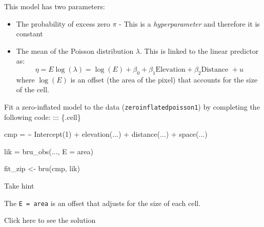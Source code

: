 \documentclass[
  letterpaper,
  DIV=11,
  numbers=noendperiod]{scrartcl}
\newenvironment{Shaded}{\begin{snugshade}}{\end{snugshade}}
\newcommand{\AttributeTok}[1]{\textcolor[rgb]{0.40,0.45,0.13}{#1}}
\newcommand{\DecValTok}[1]{\textcolor[rgb]{0.68,0.00,0.00}{#1}}
\newcommand{\ErrorTok}[1]{\textcolor[rgb]{0.68,0.00,0.00}{#1}}
\newcommand{\FunctionTok}[1]{\textcolor[rgb]{0.28,0.35,0.67}{#1}}
\newcommand{\NormalTok}[1]{\textcolor[rgb]{0.00,0.23,0.31}{#1}}
\newcommand{\OtherTok}[1]{\textcolor[rgb]{0.00,0.23,0.31}{#1}}
\newcommand{\SpecialCharTok}[1]{\textcolor[rgb]{0.37,0.37,0.37}{#1}}
\providecommand{\tightlist}{%
  \setlength{\itemsep}{0pt}\setlength{\parskip}{0pt}}\usepackage{longtable,booktabs,array}
\begin{document}
This model has two parameters:

\begin{itemize}
\tightlist
\item
  The probability of excess zero \(\pi\) - This is a
  \emph{hyperparameter} and therefore it is constant
\item
  The mean of the Poisson distribution \(\lambda\). This is linked to
  the linear predictor as: \[
  \eta = E\log(\lambda) = \log(E) + \beta_0 + \beta_1\text{Elevation} + \beta_2\text{Distance } + u
  \] where \(\log(E)\) is an offset (the area of the pixel) that
  accounts for the size of the cell.
\end{itemize}

\begin{tcolorbox}[enhanced jigsaw, colback=white, bottomrule=.15mm, arc=.35mm, opacitybacktitle=0.6, rightrule=.15mm, breakable, coltitle=black, toprule=.15mm, bottomtitle=1mm, toptitle=1mm, titlerule=0mm, left=2mm, leftrule=.75mm, title={Task}, opacityback=0, colframe=quarto-callout-warning-color-frame, colbacktitle=quarto-callout-warning-color!10!white]

Fit a zero-inflated model to the data (\texttt{zeroinflatedpoisson1}) by
completing the following code: ::: \{.cell\}

\begin{Shaded}
\begin{Highlighting}[]
\NormalTok{cmp }\OtherTok{=} \ErrorTok{\textasciitilde{}} \FunctionTok{Intercept}\NormalTok{(}\DecValTok{1}\NormalTok{) }\SpecialCharTok{+} \FunctionTok{elevation}\NormalTok{(...) }\SpecialCharTok{+} \FunctionTok{distance}\NormalTok{(...) }\SpecialCharTok{+} \FunctionTok{space}\NormalTok{(...)}

\NormalTok{lik }\OtherTok{=} \FunctionTok{bru\_obs}\NormalTok{(...,}
    \AttributeTok{E =}\NormalTok{ area)}

\NormalTok{fit\_zip }\OtherTok{\textless{}{-}} \FunctionTok{bru}\NormalTok{(cmp, lik)}
\end{Highlighting}
\end{Shaded}

\end{tcolorbox}

Take hint

The \texttt{E\ =\ area} is an offset that adjusts for the size of each
cell.

Click here to see the solution
\end{document}
